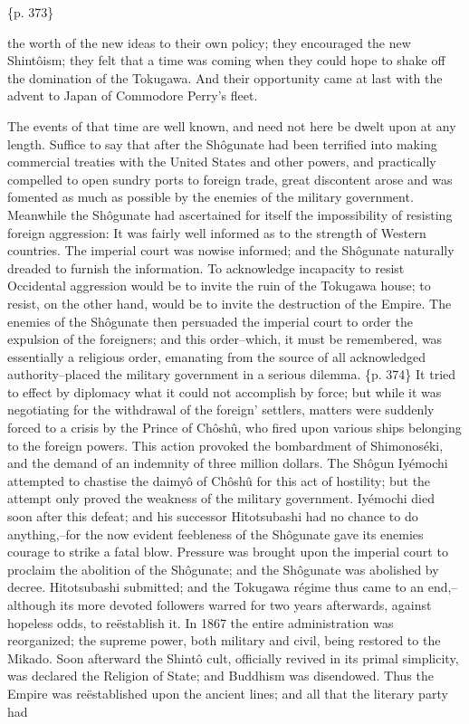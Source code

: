 \{p. 373\}

the worth of the new ideas to their own policy; they encouraged the new Shintôism; they felt that a time was coming when they could hope to shake off the domination of the Tokugawa. And their opportunity came at last with the advent to Japan of Commodore Perry's fleet.

The events of that time are well known, and need not here be dwelt upon at any length. Suffice to say that after the Shôgunate had been terrified into making commercial treaties with the United States and other powers, and practically compelled to open sundry ports to foreign trade, great discontent arose and was fomented as much as possible by the enemies of the military government. Meanwhile the Shôgunate had ascertained for itself the impossibility of resisting foreign aggression: It was fairly well informed as to the strength of Western countries. The imperial court was nowise informed; and the Shôgunate naturally dreaded to furnish the information. To acknowledge incapacity to resist Occidental aggression would be to invite the ruin of the Tokugawa house; to resist, on the other hand, would be to invite the destruction of the Empire. The enemies of the Shôgunate then persuaded the imperial court to order the expulsion of the foreigners; and this order--which, it must be remembered, was essentially a religious order, emanating from the source of all acknowledged authority--placed the military government in a serious dilemma. \{p. 374\} It tried to effect by diplomacy what it could not accomplish by force; but while it was negotiating for the withdrawal of the foreign' settlers, matters were suddenly forced to a crisis by the Prince of Chôshû, who fired upon various ships belonging to the foreign powers. This action provoked the bombardment of Shimonoséki, and the demand of an indemnity of three million dollars. The Shôgun Iyémochi attempted to chastise the daimyô of Chôshû for this act of hostility; but the attempt only proved the weakness of the military government. Iyémochi died soon after this defeat; and his successor Hitotsubashi had no chance to do anything,--for the now evident feebleness of the Shôgunate gave its enemies courage to strike a fatal blow. Pressure was brought upon the imperial court to proclaim the abolition of the Shôgunate; and the Shôgunate was abolished by decree. Hitotsubashi submitted; and the Tokugawa régime thus came to an end,--although its more devoted followers warred for two years afterwards, against hopeless odds, to reëstablish it. In 1867 the entire administration was reorganized; the supreme power, both military and civil, being restored to the Mikado. Soon afterward the Shintô cult, officially revived in its primal simplicity, was declared the Religion of State; and Buddhism was disendowed. Thus the Empire was reëstablished upon the ancient lines; and all that the literary party had

